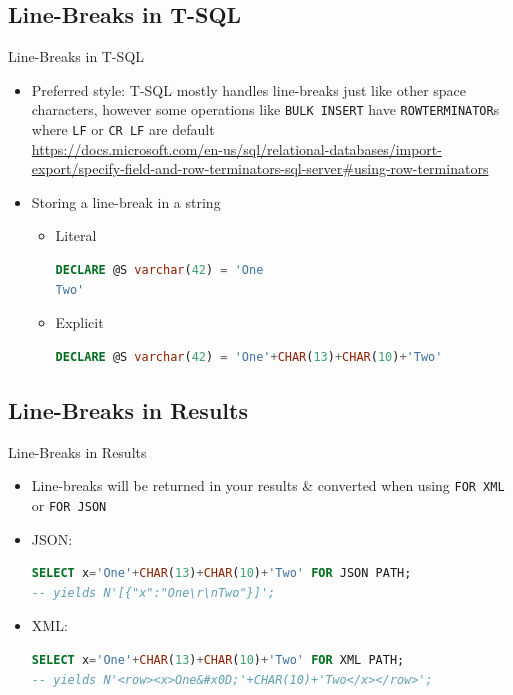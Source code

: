 \documentclass[english,aspectratio=169]{beamer}
\begin{document}
\subsection{Line-Breaks in T-SQL}
\begin{frame}[fragile]{Line-Breaks in T-SQL}
\begin{itemize}
\item Preferred style: T-SQL mostly handles line-breaks just like other space characters, however some operations like \texttt{BULK INSERT} have \texttt{ROWTERMINATOR}s where \texttt{LF} or \texttt{CR LF} are default\\
    \url{https://docs.microsoft.com/en-us/sql/relational-databases/import-export/specify-field-and-row-terminators-sql-server#using-row-terminators}
\item Storing a line-break in a string
    \begin{itemize}
    \item Literal \begin{lstlisting}[language=SQL]
DECLARE @S varchar(42) = 'One
Two'
    \end{lstlisting}
    \item Explicit \begin{lstlisting}[language=SQL]
DECLARE @S varchar(42) = 'One'+CHAR(13)+CHAR(10)+'Two'
    \end{lstlisting}
    \end{itemize}
\end{itemize}
\end{frame}

\subsection{Line-Breaks in Results}
\begin{frame}[fragile]{Line-Breaks in Results}
\begin{itemize}
    \item Line-breaks will be returned in your results \& converted when using \texttt{FOR XML} or \texttt{FOR JSON}
    \item JSON: \begin{lstlisting}[language=SQL]
SELECT x='One'+CHAR(13)+CHAR(10)+'Two' FOR JSON PATH;
-- yields N'[{"x":"One\r\nTwo"}]';
    \end{lstlisting}
    \item XML: \begin{lstlisting}[language=SQL]
SELECT x='One'+CHAR(13)+CHAR(10)+'Two' FOR XML PATH;
-- yields N'<row><x>One&#x0D;'+CHAR(10)+'Two</x></row>';
    \end{lstlisting}
\end{itemize}
\end{frame}
\end{document}
